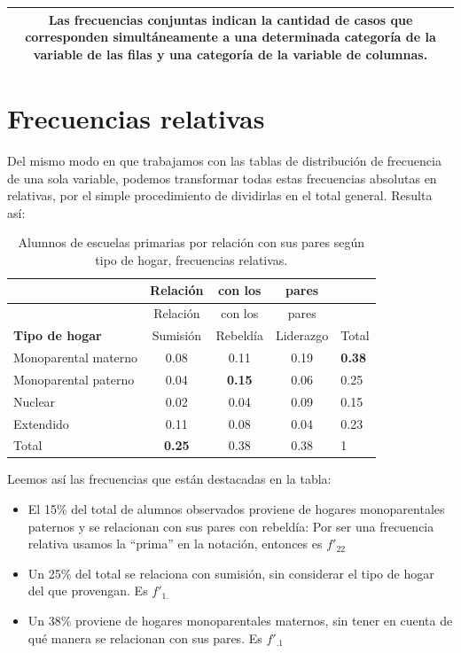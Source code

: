 \documentclass[]{book}
\begin{document}
\begin{longtable}[]{@{}c@{}}
\toprule
\endhead
\begin{minipage}[t]{0.97\columnwidth}\centering
Las \textbf{frecuencias conjuntas} indican la cantidad de casos que corresponden simultáneamente a una determinada categoría de la variable de las filas y una categoría de la variable de columnas.\strut
\end{minipage}\tabularnewline
\bottomrule
\end{longtable}

\hypertarget{frecuencias-relativas}{%
\section{Frecuencias relativas}\label{frecuencias-relativas}}

Del mismo modo en que trabajamos con las tablas de distribución de
frecuencia de una sola variable, podemos transformar todas estas
frecuencias absolutas en relativas, por el simple procedimiento de
dividirlas en el total general. Resulta así:

\begin{longtable}[]{@{}lcccl@{}}
\caption{\label{tab:unnamed-chunk-104}Alumnos de escuelas primarias por relación con sus pares según tipo de hogar, frecuencias relativas.}\tabularnewline
\toprule
& Relación & con los & pares &\tabularnewline
\midrule
\endfirsthead
\toprule
& Relación & con los & pares &\tabularnewline
\midrule
\endhead
\textbf{Tipo de hogar} & Sumisión & Rebeldía & Liderazgo & Total\tabularnewline
Monoparental materno & 0.08 & 0.11 & 0.19 & \textbf{0.38}\tabularnewline
Monoparental paterno & 0.04 & \textbf{0.15} & 0.06 & 0.25\tabularnewline
Nuclear & 0.02 & 0.04 & 0.09 & 0.15\tabularnewline
Extendido & 0.11 & 0.08 & 0.04 & 0.23\tabularnewline
Total & \textbf{0.25} & 0.38 & 0.38 & 1\tabularnewline
\bottomrule
\end{longtable}

Leemos así las frecuencias que están destacadas en la tabla:

\begin{itemize}
\item
  El 15\% del total de alumnos observados proviene de hogares
  monoparentales paternos y se relacionan con sus pares con rebeldía: Por ser una frecuencia relativa usamos la ``prima'' en la notación, entonces es \(f'_{22}\)
\item
  Un 25\% del total se relaciona con sumisión, sin considerar el tipo de hogar del que provengan. Es \(f'_{1.}\)
\item
  Un 38\% proviene de hogares monoparentales maternos, sin tener en cuenta de qué manera se relacionan con sus pares. Es \(f'_{.1}\)
\end{itemize}
\end{document}
